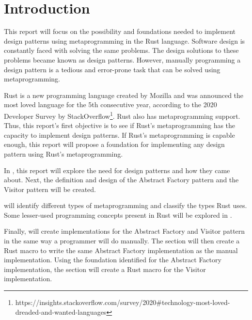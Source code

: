 \section{Introduction}
This report will focus on the possibility and foundations needed to implement design patterns using metaprogramming in the Rust language.
Software design is constantly faced with solving the same problems.
The design solutions to these problems became known as design patterns.
However, manually programming a design pattern is a tedious and error-prone task that can be solved using metaprogramming.

Rust is a new programming language created by Mozilla and was announced the most loved language for the 5th consecutive year, according to the 2020 Developer Survey by StackOverflow\footnote{https://insights.stackoverflow.com/survey/2020\#technology-most-loved-dreaded-and-wanted-languages}.
Rust also has metaprogramming support.
Thus, this report's first objective is to see if Rust's metaprogramming has the capacity to implement design patterns.
If Rust's metaprogramming is capable enough, this report will propose a foundation for implementing any design pattern using Rust's metaprogramming.

In , this report will explore the need for design patterns and how they came about.
Next, the definition and design of the Abstract Factory pattern and the Visitor pattern will be created.

 will identify different types of metaprogramming and classify the types Rust uses.
Some lesser-used programming concepts present in Rust will be explored in .

Finally,  will create implementations for the Abstract Factory and Visitor pattern in the same way a programmer will do manually.
The section will then create a Rust macro to write the same Abstract Factory implementation as the manual implementation.
Using the foundation identified for the Abstract Factory implementation, the section will create a Rust macro for the Visitor implementation.